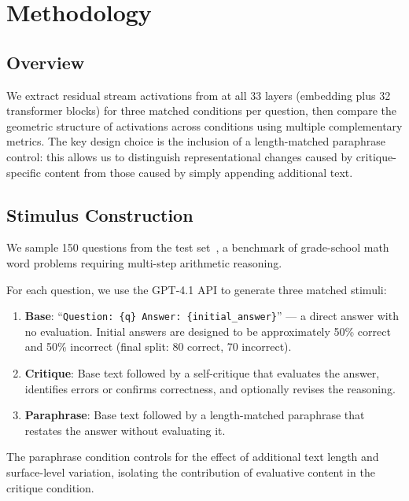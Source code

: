 \section{Methodology}
\label{sec:method}

\subsection{Overview}

We extract residual stream activations from \pythia at all 33 layers (embedding plus 32 transformer blocks) for three matched conditions per question, then compare the geometric structure of activations across conditions using multiple complementary metrics. The key design choice is the inclusion of a length-matched paraphrase control: this allows us to distinguish representational changes caused by critique-specific content from those caused by simply appending additional text.

\subsection{Stimulus Construction}
\label{sec:stimuli}

We sample 150 questions from the \gsm test set~\citep{cobbe2021training}, a benchmark of grade-school math word problems requiring multi-step arithmetic reasoning.

For each question, we use the GPT-4.1 API to generate three matched stimuli:
\begin{enumerate}[leftmargin=*,itemsep=0pt,topsep=2pt]
    \item \textbf{Base}: ``\texttt{Question: \{q\} Answer: \{initial\_answer\}}'' --- a direct answer with no evaluation. Initial answers are designed to be approximately 50\% correct and 50\% incorrect (final split: 80 correct, 70 incorrect).
    \item \textbf{Critique}: Base text followed by a self-critique that evaluates the answer, identifies errors or confirms correctness, and optionally revises the reasoning.
    \item \textbf{Paraphrase}: Base text followed by a length-matched paraphrase that restates the answer without evaluating it.
\end{enumerate}
The paraphrase condition controls for the effect of additional text length and surface-level variation, isolating the contribution of evaluative content in the critique condition.

